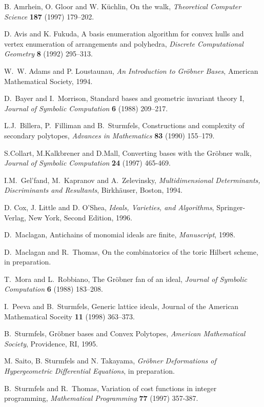 \documentclass[11pt]{article}
\begin{document}
\begin{thebibliography}{9}

 B. Amrhein, O. Gloor and W. K\"uchlin,
On the walk, {\em Theoretical Computer Science} {\bf 187}
(1997) 179--202.

 D. Avis and K. Fukuda, A basis enumeration 
algorithm for convex hulls and vertex enumeration of arrangements 
and polyhedra, {\sl Discrete Computational Geometry} {\bf 8} (1992)
295--313.

 W.~W. Adams and P. Loustaunau, 
{\sl An Introduction to Gr{\"o}bner Bases}, 
American Mathematical Society, 1994.


 D.~Bayer and I.~Morrison, 
Standard bases and geometric invariant 
theory I, {\sl Journal of Symbolic Computation} {\bf 6} (1988)
209--217.

L.J.~Billera, P.~Filliman
and B.~Sturmfels, Constructions and complexity of 
secondary polytopes, {\sl Advances in Mathematics} {\bf 83} (1990)
155--179.

 S.Collart, M.Kalkbrener and D.Mall, Converting 
bases with the Gr\"obner walk, {\em Journal of Symbolic Computation}
{\bf 24} (1997) 465-469.

 I.M.~Gel'fand, M.~Kapranov and A.~Zelevinsky,
{\sl Multidimensional Determinants, Discriminants and Resultants},
 Birkh\"auser, Boston, 1994.

 D. Cox, J.  Little and D. O'Shea,
{\sl Ideals, Varieties, and Algorithms},
Springer-Verlag, New York, Second Edition, 1996.

 D.~Maclagan, Antichains of monomial ideals are
finite, {\sl Manuscript}, 1998.

 D.~Maclagan and R.~Thomas, On the combinatorics of
the toric Hilbert scheme, in preparation.

 T.~Mora and L.~Robbiano,
The Gr\"obner fan of an ideal,
{\sl Journal of Symbolic Computation} {\bf 6} (1988) 183--208.

 I.~Peeva and B.~Sturmfels,
Generic lattice ideals, Journal of the American Mathematical 
Soceity {\bf 11} (1998) 363--373.

 B.~Sturmfels, Gr\"obner bases and Convex Polytopes,
{\em American Mathematical Society}, Providence, RI, 1995.

 M. Saito, B. Sturmfels and N. Takayama,
{\em Gr\"obner Deformations of Hypergeometric Differential Equations}, 
in preparation.

 B.~Sturmfels and R.~Thomas, Variation 
of cost functions in integer programming, {\sl Mathematical Programming}
{\bf 77} (1997) 357-387.
\end{thebibliography}
\end{document}
